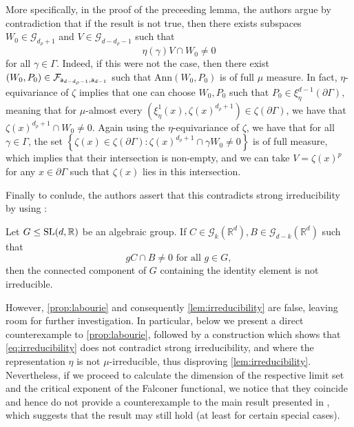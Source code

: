 \documentclass{report}
\begin{document}
More specifically, in the proof of the preceeding lemma, the authors argue by contradiction that if the result is not true, then there exists subspaces $W_0 \in \mathcal G_{d_\rho + 1}$ and $V \in \mathcal G_{d-d_\rho - 1}$ such that
\[
\eta(\gamma) V \cap W_0 \neq 0
\]
for all $\gamma \in \Gamma$.
Indeed, if this were not the case, then there exist $(W_0, P_0) \in \mathcal F_{{\sf a}_{d-d_\rho - 1}, {\sf a}_{d-1}}$ such that $\mathrm{Ann}(W_0,P_0)$ is of full $\mu$ measure.
In fact, $\eta$-equivariance of $\zeta$ implies that one can choose $W_0, P_0$ such that $P_0 \in \xi^{d-1}_\eta(\partial \Gamma)$, meaning that for $\mu$-almost every $(\xi^1_\eta(x), \zeta(x)^{d_\rho + 1}) \in \zeta(\partial \Gamma)$, we have that $\zeta(x)^{d_\rho + 1} \cap W_0 \neq 0$.
Again using the $\eta$-equivariance of $\zeta$, we have that for all $\gamma \in \Gamma$, the set 
$\left\{ \zeta(x) \in \zeta(\partial \Gamma) : \zeta(x)^{d_\rho + 1} \cap \gamma W_0 \neq 0 \right\}$
is of full measure, which implies that their intersection is non-empty, and we can take $V = \zeta(x)^p$ for any $x \in \partial \Gamma$ such that $\zeta(x)$ lies in this intersection.

Finally to conlude, the authors assert that this contradicts strong irreducibility by using \cite[Proposition 10.3]{labourie_anosov_2006}:
\begin{proposition}[Labourie]\label{prop:labourie}
Let $G \leq \operatorname{{\mathrm{SL}}}(d, \mathbb R)$ be an algebraic group.
If $C \in \mathcal G_{k}(\mathbb R^d), B \in \mathcal G_{d-k}(\mathbb R^d)$ such that
\begin{equation}\label{eq:irreducibility}
    g C \cap B \neq 0 \text{ for all } g \in G,
\end{equation}
then the connected component of $G$ containing the identity element is not irreducible.
\end{proposition}

However, \cref{prop:labourie} and consequently \cref{lem:irreducibility} are false, leaving room for further investigation.
In particular, below we present a direct counterexample to \cref{prop:labourie}, followed by a construction which shows that \cref{eq:irreducibility} does not contradict strong irreducibility, and where the representation $\eta$ is not $\mu$-irreducible, thus disproving \cref{lem:irreducibility}.
Nevertheless, if we proceed to calculate the dimension of the respective limit set and the critical exponent of the Falconer functional, we notice that they coincide and hence do not provide a counterexample to the main result presented in \cite{pozzetti_anosov_2023}, which suggests that the result may still hold (at least for certain special cases).
\end{document}
